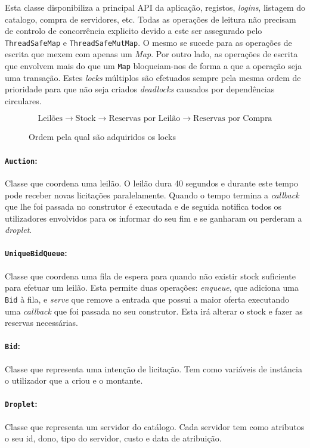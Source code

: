 \documentclass[a4paper]{article}
\begin{document}
Esta classe disponibiliza a principal API da aplicação, registos, \textit{logins}, listagem do catalogo, compra de servidores, etc. Todas as operações de leitura não precisam de controlo de concorrência explicito devido a este ser assegurado pelo \texttt{ThreadSafeMap} e \texttt{ThreadSafeMutMap}. O mesmo se sucede para as operações de escrita que mexem com apenas um \textit{Map}. Por outro lado, as operações de escrita que envolvem mais do que um \texttt{Map} bloqueiam-nos de forma a que a operação seja uma transação. Estes \textit{locks} múltiplos são efetuados sempre pela mesma ordem de prioridade para que não seja criados \textit{deadlocks} causados por dependências circulares.
\begin{figure}[H]
    \centering
    $$\textrm{Leilões} \rightarrow \textrm{Stock} \rightarrow \textrm{Reservas por Leilão} \rightarrow \textrm{Reservas por Compra}$$
    \caption{Ordem pela qual são adquiridos os locks}
\end{figure}

\paragraph{\texttt{Auction}:}
Classe que coordena uma leilão. O leilão dura 40 segundos e durante este tempo pode receber novas licitações paralelamente. Quando o tempo termina a \textit{callback} que lhe foi passada no construtor é executada e de seguida notifica todos os utilizadores envolvidos para os informar do seu fim e se ganharam ou perderam a \textit{droplet}.

\paragraph{\texttt{UniqueBidQueue}:}
Classe que coordena uma fila de espera para quando não existir stock suficiente para efetuar um leilão. Esta permite duas operações: \textit{enqueue}, que adiciona uma \texttt{Bid} à fila, e \textit{serve} que remove a entrada que possui a maior oferta executando uma \textit{callback} que foi passada no seu construtor. Esta irá alterar o stock e fazer as reservas necessárias.

\paragraph{\texttt{Bid}:}
Classe que representa uma intenção de licitação. Tem como variáveis de instância o utilizador que a criou e o montante.

\paragraph{\texttt{Droplet}:}
Classe que representa um servidor do catálogo. Cada servidor tem como atributos o seu id, dono, tipo do servidor, custo e data de atribuição.
\end{document}
